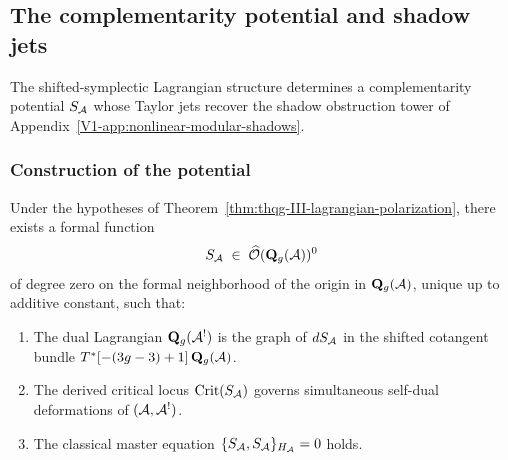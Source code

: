 %
%

\subsection{The complementarity potential and shadow jets}
\label{subsec:thqg-III-complementarity-potential}

The shifted-symplectic Lagrangian structure determines a complementarity potential $S_{\mathcal{A}}$ whose Taylor jets recover the shadow obstruction tower of
Appendix~\ref*{V1-app:nonlinear-modular-shadows}.

\subsubsection{Construction of the potential}

\begin{theorem}
Under the hypotheses of
Theorem~\textup{\ref{thm:thqg-III-lagrangian-polarization}},
there exists a formal function
\begin{equation}%
S_\cA
\;\in\;
\widehat{\mathcal{O}}(\mathbf{Q}_g(\cA))^0
\end{equation}
of degree zero on the formal neighborhood of the origin in
$\mathbf{Q}_g(\mathcal{A})$, unique up to additive constant, such that:
\begin{enumerate}[label=\textup{(\roman*)}]
\item The dual Lagrangian $\mathbf{Q}_g(\mathcal{A}^!)$ is the graph
 of $dS_{\mathcal{A}}$ in the shifted cotangent bundle
 $T^*[-(3g-3)+1]\,\mathbf{Q}_g(\mathcal{A})$.
\item The derived critical locus $\operatorname{Crit}(S_{\mathcal{A}})$
 governs simultaneous self-dual deformations of $(\mathcal{A}, \mathcal{A}^!)$.
\item The classical master equation
 $\{S_{\mathcal{A}}, S_{\mathcal{A}}\}_{H_{\mathcal{A}}} = 0$ holds.
\end{enumerate}
\end{theorem}

